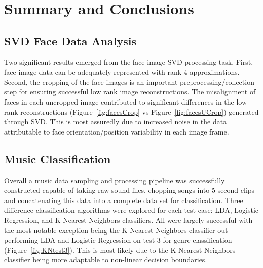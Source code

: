 \documentclass{article}
\begin{document}
\section{Summary and Conclusions}
\subsection{SVD Face Data Analysis}
Two significant results emerged from the face image SVD processing task. First, face image data can be adequately represented with rank 4 approximations. Second, the cropping of the face images is an important preprocessing/collection step for ensuring successful low rank image reconstructions. The misalignment of faces in each uncropped image contributed to significant differences in the low rank reconstructions (Figure~\ref{fig:facesCrop} vs Figure~\ref{fig:facesUCrop}) generated through SVD. This is most assuredly due to increased noise in the data attributable to face orientation/position variability in each image frame.

\subsection{Music Classification}Overall a music data sampling and processing pipeline was successfully constructed capable of taking raw sound files, chopping songs into 5 second clips and concatenating this data into a complete data set for classification. Three difference classification algorithms were explored for each test case: LDA, Logistic Regression, and K-Nearest Neighbors classifiers. All were largely successful with the most notable exception being the K-Nearest Neighbors classifier out performing LDA and Logistic Regression on test 3 for genre classification (Figure~\ref{fig:KNtest3}). This is most likely due to the K-Nearest Neighbors classifier being more adaptable to non-linear decision boundaries.

\printbibliography
\end{document}
